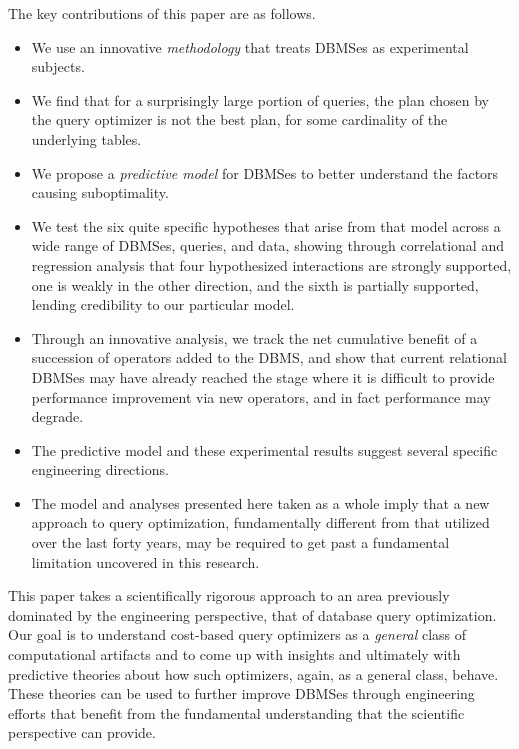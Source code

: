 \documentclass[prodmode,acmtods]{acmsmall}
\begin{document}
\pagebreak
The key contributions of this paper are as follows.
\begin{itemize} 
\item We use an innovative {\em methodology} that treats \hbox{DBMSes} as experimental subjects.

\item We find that for a surprisingly large portion of queries, the plan
  chosen  by the query optimizer is not the best plan, for some cardinality
  of the underlying tables.

\item We propose a {\em predictive model} for \hbox{DBMSes} to better
  understand the factors causing suboptimality.

\item We test the six quite specific hypotheses that arise from that
  model across a wide range of DBMSes, queries, and data, showing
  through correlational and regression analysis that four
  hypothesized interactions are strongly supported, one is weakly in the
  other direction, and
  the sixth is partially supported, lending credibility to our particular model.

\item Through an innovative
  analysis, we track the net cumulative benefit of a succession of operators
  added to the DBMS, and show that current relational DBMSes may have
  already reached the stage where it is difficult to provide performance
  improvement via new operators, and in fact performance may degrade.

\item The predictive model and these experimental results suggest several specific
  engineering directions.

\item The model and analyses presented here taken as a whole imply that a
  new approach to query optimization, fundamentally
  different from that utilized over the last forty years, may be required
  to get past a fundamental limitation uncovered in this research.
\end{itemize}

This paper takes a scientifically rigorous approach to an
area previously dominated by the engineering perspective, that of database
query optimization.  Our goal is to \hbox{understand} cost-based query optimizers
as a {\em general} class of computational artifacts and to come up with
insights and ultimately with predictive theories about how such optimizers,
again, as a general class, behave.  These theories can be used to further
improve \hbox{DBMSes} through engineering \hbox{efforts} that benefit from the fundamental
understanding that the scientific perspective can provide.
\end{document}

